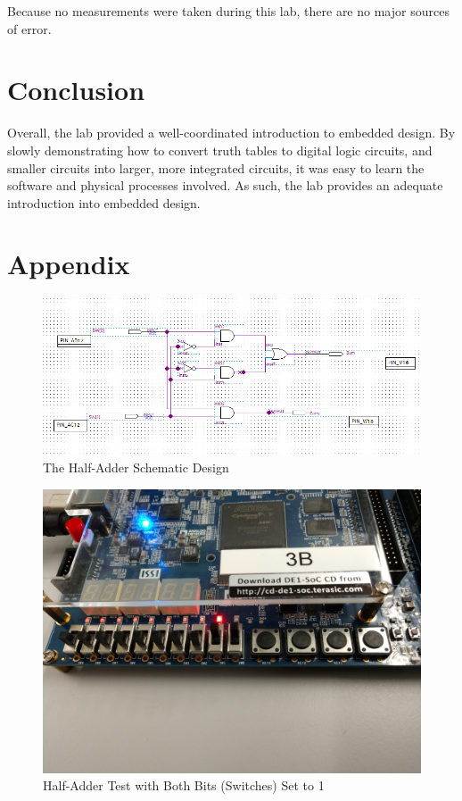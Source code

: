 \documentclass[
	letterpaper, %
	10pt, %
]{CSUniSchoolLabReport}
\begin{document}
  \hspace{.5 in} Because no measurements were taken during this lab, there are no major sources of error.

  \section{Conclusion}

  \hspace{.5 in} Overall, the lab provided a well-coordinated introduction to embedded design. By slowly demonstrating how to convert truth tables to digital logic circuits, and smaller circuits into larger, more integrated circuits, it was easy to learn the software and physical processes involved. As such, the lab provides an adequate introduction into embedded design.

  \newpage

\section{Appendix}

\begin{figure}[h!]
  \centering
  \includegraphics[width=.9\textwidth]{Figures/HalfAddDesign.png}
  \caption{The Half-Adder Schematic Design}
  \label{fig:1}
\end{figure}

\begin{figure}[h!]
  \centering
  \includegraphics[width=.9\textwidth]{Figures/HalfAdder.jpg}
  \caption{Half-Adder Test with Both Bits (Switches) Set to 1}
  \label{fig:2}
\end{figure}
\end{document}
